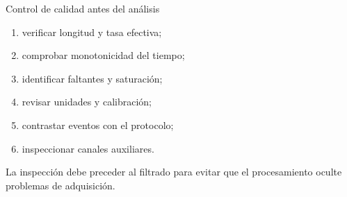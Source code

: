 \documentclass[
  ignorenonframetext,
  aspectratio=169,
  spanish,
]{beamer}
\providecommand{\faExclamation}{\faIcon{exclamation}}
\providecommand{\tightlist}{%
  \setlength{\itemsep}{0pt}\setlength{\parskip}{0pt}}
\begin{document}
\begin{frame}{Control de calidad antes del análisis}
  \protect{}\label{control-de-calidad-antes-del-anuxe1lisis}
  \begin{enumerate}
    \tightlist
    \item
          verificar longitud y tasa efectiva;
    \item
          comprobar monotonicidad del tiempo;
    \item
          identificar faltantes y saturación;
    \item
          revisar unidades y calibración;
    \item
          contrastar eventos con el protocolo;
    \item
          inspeccionar canales auxiliares.
  \end{enumerate}

  \begin{tcolorbox}[enhanced jigsaw, arc=.35mm, bottomrule=.15mm, bottomtitle=1mm, breakable, colback=white, colbacktitle=quarto-callout-important-color!10!white, colframe=quarto-callout-important-color-frame, coltitle=black, left=2mm, leftrule=.75mm, opacityback=0, opacitybacktitle=0.6, rightrule=.15mm, title=\textcolor{quarto-callout-important-color}{\faExclamation}\hspace{0.5em}{Importante}, titlerule=0mm, toprule=.15mm, toptitle=1mm]

    La inspección debe preceder al filtrado para evitar que el procesamiento
    oculte problemas de adquisición.

  \end{tcolorbox}
\end{frame}
\end{document}
